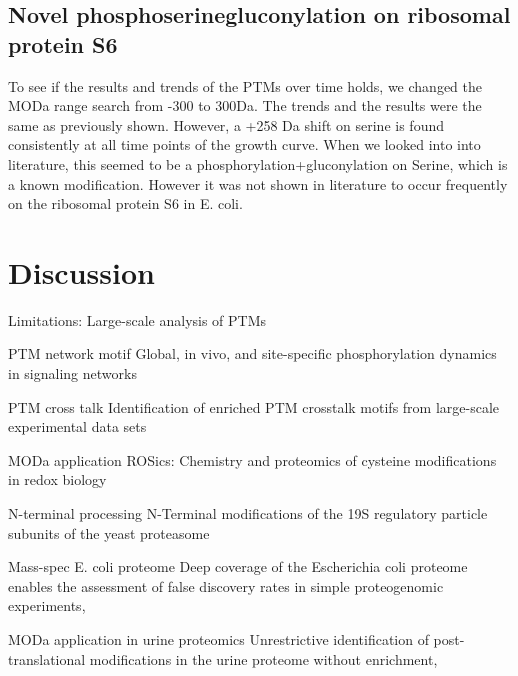 \documentclass[12pt]{article}
\begin{document}
\subsection{Novel phosphoserinegluconylation on ribosomal protein S6}
To see if the results and trends of the PTMs over time holds, we changed the MODa range search from -300 to 300Da. The trends and the results were the same as previously shown. However, a +258 Da shift on serine is found consistently at all time points of the growth curve. When we looked into into literature, this seemed to be a phosphorylation+gluconylation on Serine, which is a known modification. However it was not shown in literature to occur frequently on the ribosomal protein S6 in E. coli.

\section{Discussion}

Limitations:
Large-scale analysis of PTMs \cite{OlsenMann2013}

PTM network motif \cite{Olsenetal2006}
{Global, in vivo, and site-specific phosphorylation dynamics in signaling networks}

PTM cross talk \cite{Pengetal2014}
{Identification of enriched PTM crosstalk motifs from large-scale experimental data sets}

MODa application \cite{Kimetal2014}
{ROSics: Chemistry and proteomics of cysteine modifications in redox biology}

N-terminal processing \cite{Kimuraetal2003}
{N-Terminal modifications of the 19S regulatory particle subunits of the yeast proteasome}

Mass-spec E. coli proteome \cite{Krugetal2013}
{Deep coverage of the Escherichia coli proteome enables the assessment of false discovery rates in simple proteogenomic experiments},

MODa application in urine proteomics \cite{Liuetal2013}
{Unrestrictive identification of post-translational modifications in the urine proteome without enrichment},
\end{document}
